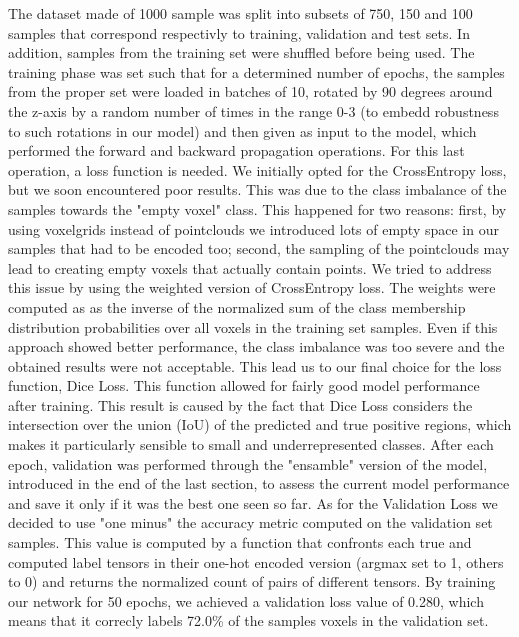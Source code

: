 The dataset made of 1000 sample was split into subsets of 750, 150 and 100 samples that correspond respectivly
to training, validation and test sets. In addition, samples from the training set were shuffled before being used.
The training phase was set such that for a determined number of epochs, the samples from the proper
set were loaded in batches of 10, rotated by 90 degrees around the z-axis by a random number
of times in the range 0-3 (to embedd robustness to such rotations in our model) and then given as 
input to the model, which performed the forward and backward propagation operations.
For this last operation, a loss function is needed.
We initially opted for the CrossEntropy loss, but we soon encountered poor results. This was due to the class imbalance of the
samples towards the "empty voxel" class. This happened for two reasons: first, by using voxelgrids instead of pointclouds
we introduced lots of empty space in our samples that had to be encoded too; second, the sampling of the pointclouds may lead 
to creating empty voxels that actually contain points.
We tried to address this issue by using the weighted version of CrossEntropy loss.
The weights were computed as as the inverse of the normalized sum of the class membership distribution probabilities 
over all voxels in the training set samples.
Even if this approach showed better performance, the class imbalance was too severe and the obtained results were not acceptable.
This lead us to our final choice for the loss function, Dice Loss.
This function allowed for fairly good model performance after training. This result is caused by the fact that Dice Loss considers 
the intersection over the union (IoU) of the predicted and true positive regions, which makes it particularly sensible to small 
and underrepresented classes.
After each epoch, validation was performed through the "ensamble" version of the model, introduced in the end of the last section,
to assess the current model performance and save it only if it was the best one seen so far. 
As for the Validation Loss we decided to use "one minus" the accuracy metric computed on the validation set samples.
This value is computed by a function that confronts each true and computed label tensors in their one-hot encoded version 
(argmax set to 1, others to 0) and returns the normalized count of pairs of different tensors.
By training our network for 50 epochs, we achieved a validation loss value of 0.280, which
means that it correcly labels 72.0\% of the samples voxels in the validation set.